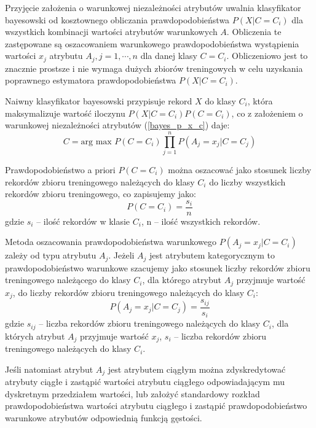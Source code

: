 Przyjęcie założenia o warunkowej niezależności atrybutów uwalnia klasyfikator bayesowski od kosztownego obliczania prawdopodobieństwa $P(X | C = C_i)$ dla wszystkich kombinacji wartości atrybutów warunkowych $A$. Obliczenia te zastępowane są oszacowaniem warunkowego prawdopodobieństwa wystąpienia wartości $x_j$ atrybutu $A_j, j = 1, \cdots, n$ dla danej klasy $C = C_i$. Obliczeniowo jest to znacznie prostsze i nie wymaga dużych zbiorów treningowych w celu uzyskania poprawnego estymatora prawdopodobieństwa $P(X | C = C_i)$.

Naiwny klasyfikator bayesowski przypisuje rekord $X$ do klasy $C_i$, która maksymalizuje wartość iloczynu $P(X | C = C_i) P(C = C_i)$, co z założeniem o warunkowej niezależności atrybutów (\ref{bayes_p_x_c}) daje:
\begin{equation} 
\label{bayes_C} 
C = \text{arg max } P(C = C_i) \prod\limits_{j = 1}^n P(A_j = x_j | C = C_j)
\end{equation}

Prawdopodobieństwo a priori $P(C = C_i)$ można oszacować jako stosunek liczby rekordów zbioru treningowego należących do klasy $C_i$ do liczby wszystkich rekordów zbioru treningowego, co zapisujemy jako:
\begin{equation} 
\label{bayes_C_n} 
P(C = C_i) = \frac{s_i}{n}
\end{equation} gdzie $s_i$ -- ilość rekordów w klasie $C_i$, n -- ilość wszystkich rekordów.

Metoda oszacowania prawdopodobieństwa warunkowego $P(A_j = x_j | C = C_i)$ zależy od typu atrybutu $A_j$. Jeżeli $A_j$ jest atrybutem kategorycznym to prawdopodobieństwo warunkowe szacujemy jako stosunek liczby rekordów zbioru treningowego należącego do klasy $C_i$, dla którego atrybut $A_j$ przyjmuje wartość $x_j$, do liczby rekordów zbioru treningowego należących do klasy $C_i$:
\begin{equation} 
\label{bayes_PAC} 
P(A_j = x_j | C = C_j) = \frac{s_{ij}}{s_i}
\end{equation} gdzie $s_{ij}$ -- liczba rekordów zbioru treningowego należących do klasy $C_i$, dla których atrybut $A_j$ przyjmuje wartość $x_j$, $s_i$ -- liczba rekordów zbioru treningowego należących do klasy $C_i$.

Jeśli natomiast atrybut $A_j$ jest atrybutem ciągłym można zdyskredytować atrybuty ciągłe i zastąpić wartości atrybutu ciągłego odpowiadającym mu dyskretnym przedziałem wartości, lub założyć standardowy rozkład prawdopodobieństwa wartości atrybutu ciągłego i zastąpić prawdopodobieństwo warunkowe atrybutów odpowiednią funkcją gęstości.

